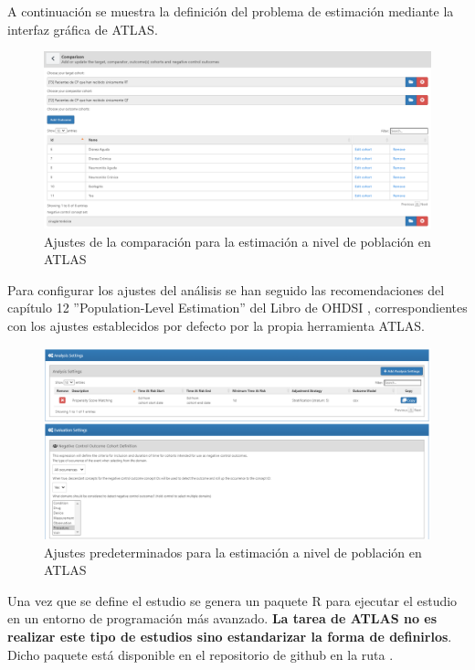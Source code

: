 A continuación se muestra la definición del problema de estimación mediante la interfaz gráfica de ATLAS.

\begin{figure}[H]
    \centering
    \includegraphics[width=1\textwidth]{figures/comparisonPLE.png}
    \caption{Ajustes de la comparación para la estimación a nivel de población en ATLAS}
    \label{figure:comparisonPLE}
\end{figure}

Para configurar los ajustes del análisis se han seguido las recomendaciones del capítulo 12 ''Population-Level Estimation'' del Libro de OHDSI \parencite{OHDSIbook}, correspondientes con los ajustes establecidos por defecto por la propia herramienta ATLAS. 

\begin{figure}[H]
    \centering
    \includegraphics[width=1\textwidth]{figures/ajustesPLE.png}
    \caption{Ajustes predeterminados para la estimación a nivel de población en ATLAS}
    \label{figure:ajustesPLE}
\end{figure}


Una vez que se define el estudio se genera un paquete R para ejecutar el estudio en un entorno de programación más avanzado.\textbf{ La tarea de ATLAS no es realizar este tipo de estudios sino estandarizar la forma de definirlos}. Dicho paquete está disponible en el repositorio de github en la ruta .


